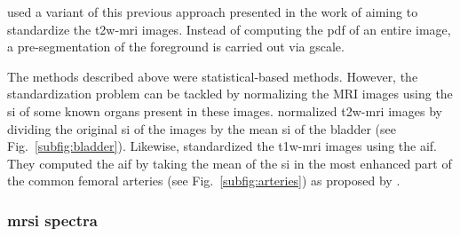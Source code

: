 \begin{enumerate}[leftmargin=*]

\cite{Viswanath2009,Viswanath2011,Viswanath2012} used a variant of this previous approach presented in the work of \cite{Madabhushi2006a} aiming to standardize the \ac{t2w}-\ac{mri} images. Instead of computing the \ac{pdf} of an entire image, a pre-segmentation of the foreground is carried out via \ac{gscale}.%

The methods described above were statistical-based methods. However, the standardization problem can be tackled by normalizing the MRI images using the \ac{si} of some known organs present in these images. \cite{Niaf2011,Niaf2012} normalized \ac{t2w}-\ac{mri} images by dividing the original \ac{si} of the images by the mean \ac{si} of the bladder (see Fig.~\ref{subfig:bladder}). Likewise, \cite{Niaf2011} standardized the \ac{t1w}-\ac{mri} images using the \ac{aif}. They computed the \ac{aif} by taking the mean of the \ac{si} in the most enhanced part of the common femoral arteries (see Fig.~\ref{subfig:arteries}) as proposed by \cite{Wiart2007}.

\end{enumerate}

\subsubsection{\ac{mrsi} spectra}

